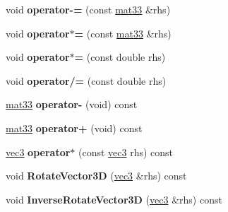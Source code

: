 \begin{DoxyCompactItemize}
\item 
\hypertarget{classmath_1_1mat33_a0679ff839e7352a26ae02562c868d29e}{
void {\bfseries operator-\/=} (const \hyperlink{classmath_1_1mat33}{mat33} \&rhs)}
\label{classmath_1_1mat33_a0679ff839e7352a26ae02562c868d29e}

\item 
\hypertarget{classmath_1_1mat33_afd081a8e32feff6d0d0eb438d3d83cb2}{
void {\bfseries operator$\ast$=} (const \hyperlink{classmath_1_1mat33}{mat33} \&rhs)}
\label{classmath_1_1mat33_afd081a8e32feff6d0d0eb438d3d83cb2}

\item 
\hypertarget{classmath_1_1mat33_a9daba0ec147864bc263848cefa9bf98a}{
void {\bfseries operator$\ast$=} (const double rhs)}
\label{classmath_1_1mat33_a9daba0ec147864bc263848cefa9bf98a}

\item 
\hypertarget{classmath_1_1mat33_a5aa053c89065b138e75c708b44a36f15}{
void {\bfseries operator/=} (const double rhs)}
\label{classmath_1_1mat33_a5aa053c89065b138e75c708b44a36f15}

\item 
\hypertarget{classmath_1_1mat33_a62a0f41af31620230e3fc77693aabfd3}{
\hyperlink{classmath_1_1mat33}{mat33} {\bfseries operator-\/} (void) const }
\label{classmath_1_1mat33_a62a0f41af31620230e3fc77693aabfd3}

\item 
\hypertarget{classmath_1_1mat33_a94fb232001ecafebb4cfd621aaf51108}{
\hyperlink{classmath_1_1mat33}{mat33} {\bfseries operator+} (void) const }
\label{classmath_1_1mat33_a94fb232001ecafebb4cfd621aaf51108}

\item 
\hypertarget{classmath_1_1mat33_ab46b1390093ed27b72ce000958762f20}{
\hyperlink{classmath_1_1vec3}{vec3} {\bfseries operator$\ast$} (const \hyperlink{classmath_1_1vec3}{vec3} rhs) const }
\label{classmath_1_1mat33_ab46b1390093ed27b72ce000958762f20}

\item 
\hypertarget{classmath_1_1mat33_a31959472a588cfc4b041562f852d4d57}{
void {\bfseries RotateVector3D} (\hyperlink{classmath_1_1vec3}{vec3} \&rhs) const }
\label{classmath_1_1mat33_a31959472a588cfc4b041562f852d4d57}

\item 
\hypertarget{classmath_1_1mat33_ae8555ed0819334f20c0c60bce9af4a19}{
void {\bfseries InverseRotateVector3D} (\hyperlink{classmath_1_1vec3}{vec3} \&rhs) const }
\label{classmath_1_1mat33_ae8555ed0819334f20c0c60bce9af4a19}


\end{DoxyCompactItemize}
